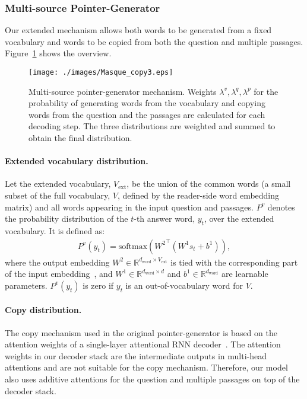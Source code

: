 \documentclass[11pt,a4paper]{article}
\theoremstyle{mydef}
\theoremstyle{myprob}
\begin{document}
\subsubsection{Multi-source Pointer-Generator}
\label{sec:copy}

Our extended %
mechanism allows both 
words to be generated from a fixed vocabulary and words to be copied from both the question and multiple passages. Figure~\ref{fig:copy} shows the overview.

\begin{figure}[t!]
\centering
\texttt{[image: ./images/Masque\_copy3.eps]}
\caption{Multi-source pointer-generator mechanism. Weights $\lambda^v, \lambda^q, \lambda^p$ for the probability of generating words from the vocabulary and copying words from the question and the passages are calculated for each decoding step. The three distributions are weighted and summed to obtain the final distribution.}
\label{fig:copy}
\end{figure}

\paragraph{Extended vocabulary distribution.}
Let the extended vocabulary,  $V_\mathrm{ext}$, be the union of the common words (a small subset of the full vocabulary, $V$, defined by the reader-side word embedding matrix) and all words appearing in the input question and passages. $P^v$ denotes the probability distribution of the $t$-th answer word, $y_t$, over the extended vocabulary. It is defined as:
\begin{align}
P^v(y_t)  =\mathrm{softmax}({W^2}^\top (W^1 s_t  + b^1)),
\end{align}
where the output embedding $W^2 \in \mathbb{R}^{d_\mathrm{word} \times V_\mathrm{ext}}$ is tied with the corresponding part of the input embedding~\citep{InanKS17}, and $W^1 \in \mathbb{R}^{d_\mathrm{word} \times d}$ and $b^1 \in \mathbb{R}^{d_\mathrm{word}}$ are learnable parameters. $P^v(y_t)$ is zero if $y_t$ is an out-of-vocabulary word for $V$.

\paragraph{Copy distribution.}
The copy mechanism used in the original pointer-generator is based on the attention weights of a single-layer attentional RNN decoder~\citep{SeeLM17}. The attention weights in our decoder stack are the intermediate outputs in multi-head attentions and are not suitable for the copy mechanism. Therefore, our model also uses additive attentions for the question and multiple passages on top of the decoder stack. 
\end{document}
